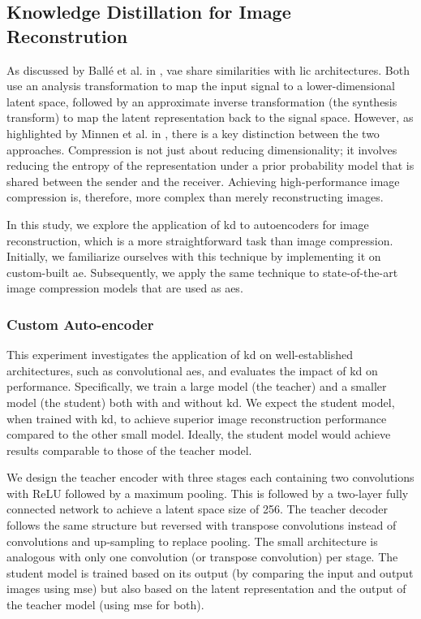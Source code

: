 \documentclass{article}
\begin{document}
\subsection{Knowledge Distillation for Image Reconstrution}
As discussed by Ballé et al. in \cite{balle2018variationalimagecompressionscale}, \acrfull{vae} share similarities with \acrshort{lic} architectures. Both use an analysis transformation to map the input signal to a lower-dimensional latent space, followed by an approximate inverse transformation (the synthesis transform) to map the latent representation back to the signal space. However, as highlighted by Minnen et al. in \cite{minnen2018jointautoregressivehierarchicalpriors}, there is a key distinction between the two approaches. Compression is not just about reducing dimensionality; it involves reducing the entropy of the representation under a prior probability model that is shared between the sender and the receiver. Achieving high-performance image compression is, therefore, more complex than merely reconstructing images.

In this study, we explore the application of \acrshort{kd} to autoencoders for image reconstruction, which is a more straightforward task than image compression. Initially, we familiarize ourselves with this technique by implementing it on custom-built \acrfull{ae}. Subsequently, we apply the same technique to state-of-the-art image compression models that are used as \acrshort{ae}s.

\subsubsection{Custom Auto-encoder}
This experiment investigates the application of \acrshort{kd} on well-established architectures, such as convolutional \acrshort{ae}s, and evaluates the impact of \acrshort{kd} on performance. Specifically, we train a large model (the teacher) and a smaller model (the student) both with and without \acrshort{kd}. We expect the student model, when trained with \acrshort{kd}, to achieve superior image reconstruction performance compared to the other small model. Ideally, the student model would achieve results comparable to those of the teacher model.

We design the teacher encoder with three stages each containing two convolutions with ReLU followed by a maximum pooling. This is followed by a two-layer fully connected network to achieve a latent space size of 256. The teacher decoder follows the same structure but reversed with transpose convolutions instead of convolutions and up-sampling to replace pooling. The small architecture is analogous with only one convolution (or transpose convolution) per stage. The student model is trained based on its output (by comparing the input and output images using \acrshort{mse}) but also based on the latent representation and the output of the teacher model (using \acrshort{mse} for both).
\end{document}
